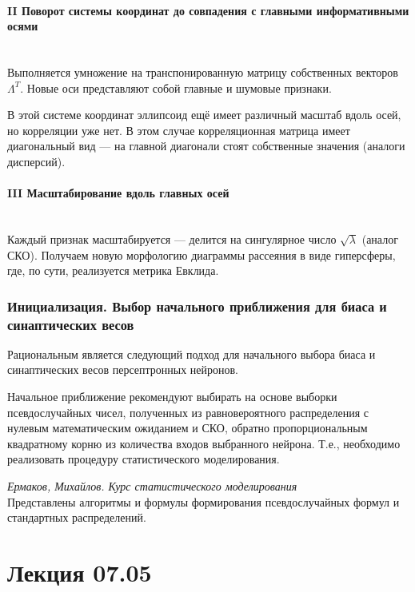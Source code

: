 \documentclass[a4paper]{article}
\numberwithin{equation}{subsection}
\begin{document}
\paragraph{II Поворот системы координат до совпадения с 
главными информативными осями}\mbox{}\\
Выполняется умножение на транспонированную матрицу собственных векторов $\Lambda^T$.
Новые оси представляют собой главные и шумовые признаки.

В этой системе координат эллипсоид ещё имеет различный масштаб вдоль осей, но корреляции
уже нет.
В этом случае корреляционная матрица имеет диагональный вид --- на главной диагонали
стоят собственные значения (аналоги дисперсий).


\paragraph{III Масштабирование вдоль главных осей}\mbox{}\\
Каждый признак масштабируется --- делится на сингулярное число $\sqrt{\lambda}$
(аналог СКО).
Получаем новую морфологию диаграммы рассеяния в виде гиперсферы, где, по сути, реализуется
метрика Евклида.




\subsubsection{Инициализация. Выбор начального приближения для 
биаса и синаптических весов}

Рациональным является следующий подход для начального выбора биаса и синаптических
весов персептронных нейронов.

Начальное приближение рекомендуют выбирать на основе выборки псевдослучайных чисел,
полученных из равновероятного распределения с нулевым математическим ожиданием 
и СКО, обратно пропорциональным квадратному корню из количества входов выбранного нейрона.
Т.е., необходимо реализовать процедуру статистического моделирования.

\begin{myquote}
    \textit{Ермаков, Михайлов. Курс статистического моделирования}\\
    Представлены алгоритмы и формулы формирования псевдослучайных формул
    и стандартных распределений.
\end{myquote}



\newpage
\section{Лекция 07.05}
\end{document}

